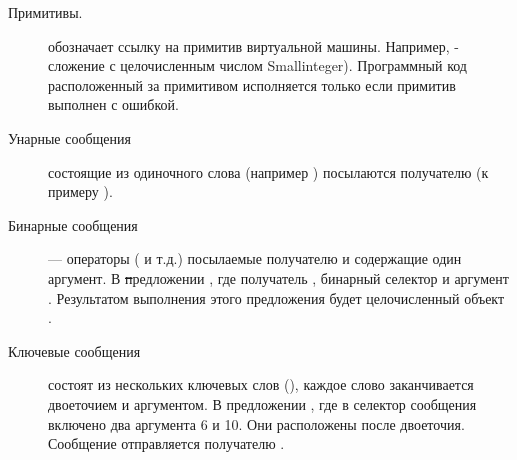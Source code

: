 \documentclass[a4paper,10pt,twoside]{book}
\begin{document}
\begin{description}
\item[Примитивы.]	 обозначает ссылку на примитив виртуальной машины.
	Например,  - сложение с целочисленным числом Smallinteger).
	Программный код расположенный за примитивом исполняется только если примитив выполнен с ошибкой.


\item[Унарные сообщения] состоящие из одиночного слова (например ) посылаются получателю (к примеру ).


\item[Бинарные сообщения] --- операторы (\ct{+}\ct{-}\ct{/}\ct{-}\ct{>} и т.д.) посылаемые получателю и содержащие один аргумент.
	В \st предложении , где получатель , бинарный селектор \ct{+} и аргумент .
	Результатом выполнения этого предложения будет целочисленный объект .


\item[Ключевые сообщения] состоят из нескольких ключевых слов (),
	каждое слово заканчивается двоеточием и аргументом.
	В предложении , где в селектор сообщения  включено два аргумента 6 и 10.
	Они расположены после двоеточия.
	Сообщение отправляется получателю .


\end{description}
\end{document}
